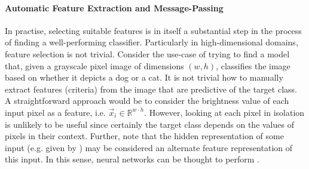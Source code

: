 \documentclass[
	fontsize=10pt, %
	twoside=false, %
	secnumdepth=1, %
  toc=indentunnumbered %
]{kaobook}
\begin{document}
\paragraph{Automatic Feature Extraction and Message-Passing}
In practise, selecting suitable features is in itself a substantial
step in the process of finding a well-performing classifier.
%
Particularly in high-dimensional domains, feature selection is not trivial.
Consider the use-case of trying to find a model that, given a grayscale pixel
image of dimensions $(w, h)$, classifies the image based on whether it depicts a
dog or a cat. It is not trivial how to manually extract features (criteria) from
the image that are predictive of the target class. A straightforward approach
would be to consider the brightness value of each input pixel as a feature, i.e.
$\vec x_i \in \mathbb{R}^{w \cdot h}$. However, looking at each
pixel in isolation is unlikely to be useful since certainly the target class
depends on the values of pixels in their context.
Further, note that the hidden representation of some input (e.g. given by
) may be considered an alternate feature representation
of this input. In this sense, neural networks can be thought to perform
. 

\end{document}
